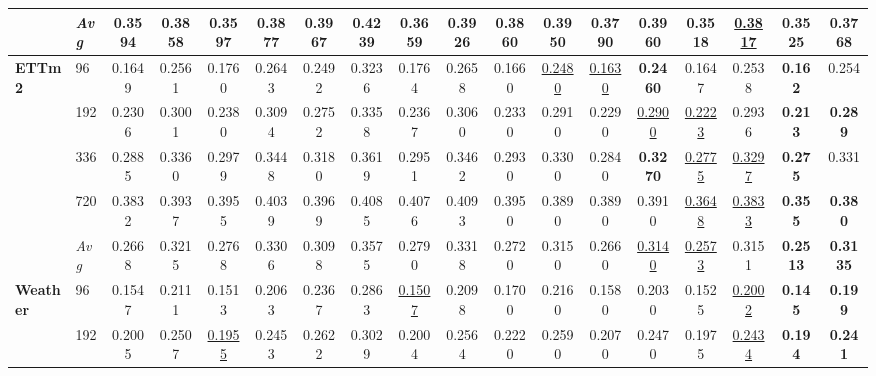 \begin{tabular}{llcccccccccccccccc}
               & \textit{Avg} &         0.3594 &         0.3858 &         0.3597 &         0.3877 &         0.3967 &         0.4239 &         0.3659 &         0.3926 &         0.3860 &         0.3950 &         0.3790 &         0.3960 & \textbf{0.3518} & \underline{0.3817} & \textbf{0.3525} & \textbf{0.3768} \\
\midrule
\textbf{ETTm2} & 96         &         0.1649 &         0.2561 &         0.1760 &         0.2643 &         0.2492 &         0.3236 &         0.1764 &         0.2658 &         0.1660 & \underline{0.2480} & \underline{0.1630} & \textbf{0.2460} &         0.1647 &         0.2538 & \textbf{0.162} &          0.254 \\
               & 192        &         0.2306 &         0.3001 &         0.2380 &         0.3094 &         0.2752 &         0.3358 &         0.2367 &         0.3060 &         0.2330 &         0.2910 &         0.2290 & \underline{0.2900} & \underline{0.2223} &         0.2936 & \textbf{0.213} & \textbf{0.289} \\
               & 336        &         0.2885 &         0.3360 &         0.2979 &         0.3448 &         0.3180 &         0.3619 &         0.2951 &         0.3462 &         0.2930 &         0.3300 &         0.2840 & \textbf{0.3270} & \underline{0.2775} & \underline{0.3297} & \textbf{0.275} &          0.331 \\
               & 720        &         0.3832 &         0.3937 &         0.3955 &         0.4039 &         0.3969 &         0.4085 &         0.4076 &         0.4093 &         0.3950 &         0.3890 &         0.3890 &         0.3910 & \underline{0.3648} & \underline{0.3833} & \textbf{0.355} & \textbf{0.380} \\
               & \textit{Avg} &         0.2668 &         0.3215 &         0.2768 &         0.3306 &         0.3098 &         0.3575 &         0.2790 &         0.3318 &         0.2720 &         0.3150 &         0.2660 & \underline{0.3140} & \underline{0.2573} &         0.3151 & \textbf{0.2513} & \textbf{0.3135} \\
\midrule
\textbf{Weather} & 96         &         0.1547 &         0.2111 &         0.1513 &         0.2063 &         0.2367 &         0.2863 & \underline{0.1507} &         0.2098 &         0.1700 &         0.2160 &         0.1580 &         0.2030 &         0.1525 & \underline{0.2002} & \textbf{0.145} & \textbf{0.199} \\
               & 192        &         0.2005 &         0.2507 & \underline{0.1955} &         0.2453 &         0.2622 &         0.3029 &         0.2004 &         0.2564 &         0.2220 &         0.2590 &         0.2070 &         0.2470 &         0.1975 & \underline{0.2434} & \textbf{0.194} & \textbf{0.241} \\

\end{tabular}
